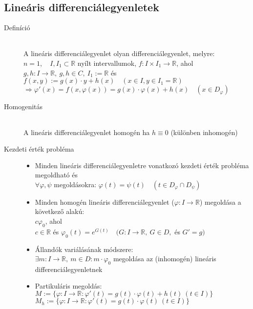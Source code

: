 \documentclass[margin=0px]{article}
\newcommand{\R}{\mathbb{R}}
\begin{document}
\subsection{Lineáris differenciálegyenletek}
\begin{description}
    \item[Definíció] \hfill \\
        A lineáris differenciálegyenlet olyan differenciálegyenlet, melyre:\\
        $ n=1, \quad I,I_1 \subset \R $ nyílt intervallumok, $f:I\times I_1 \rightarrow \R$, ahol \\
        $g,h : I \rightarrow \R, \ g,h \in C, \ I_1 := \R$ és \\
        $f(x,y) := g(x)\cdot y + h(x) \quad (x \in I, y \in I_1 = \R) $\\
        $ \Rightarrow \varphi'(x) = f(x, \varphi(x)) = g(x) \cdot \varphi(x) + h(x) \quad (x \in D_{\varphi})$
    \item[Homogenitás] \hfill \\
        A lineáris differenciálegyenlet homogén ha $ h \equiv 0$ (különben inhomogén)
    \item[Kezdeti érték probléma] \hfill
        \begin{itemize}
            \item Minden lineáris differenciálegyenletre vonatkozó kezdeti érték probléma megoldható és \\
                  $\forall \varphi, \psi $ megoldásokra: $ \varphi(t) = \psi(t) \quad (t \in D_{\varphi} \cap D_{\psi} )$
            \item Minden homogén lineáris differenciálegyenlet ($\varphi : I \rightarrow \R$) megoldása a következő alakú: \\
                  $ c\varphi_0$, ahol \\
                  $c \in \R$ és $\varphi_0(t) = e^{G(t)} \quad (G:I\rightarrow\R, \ G \in D, $ és $ G' = g)$
            \item Állandók variálásának módszere:\\
                  $ \exists m:I\rightarrow\R, \ m \in D : m\cdot\varphi_0$ megoldása az (inhomogén) lineáris differenciálegyenletnek
            \item Partikuláris megoldás: \\
                  $M := \{ \varphi : I \rightarrow \R : \varphi'(t) = g(t)\cdot\varphi(t) + h(t) \ (t \in I)\} $ \\
                  $M_h := \{ \varphi : I \rightarrow \R : \varphi'(t) = g(t)\cdot\varphi(t) \ (t \in I)\} $\\

\end{itemize}
\end{description}
\end{document}
